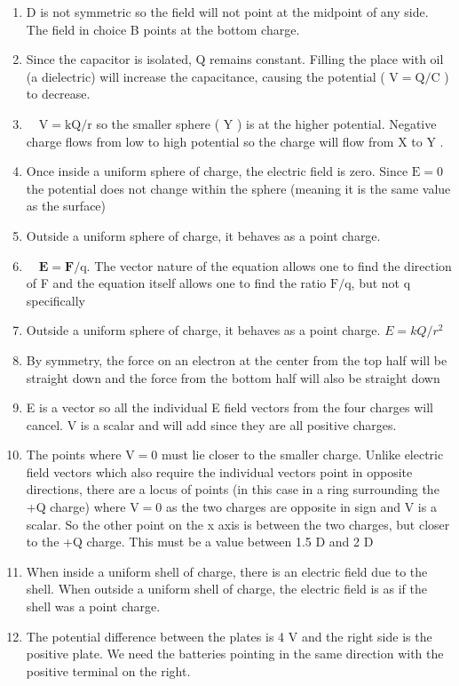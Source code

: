 \begin{enumerate}
\begin{enumerate}
  \item D is not symmetric so the field will not point at the midpoint of any side. The field in choice B points at the bottom charge.
  \item Since the capacitor is isolated, Q remains constant. Filling the place with oil (a dielectric) will increase the capacitance, causing the potential ( $\mathrm{V}=\mathrm{Q} / \mathrm{C}$ ) to decrease.
  \item $\quad \mathrm{V}=\mathrm{kQ} / \mathrm{r}$ so the smaller sphere ( Y ) is at the higher potential. Negative charge flows from low to high potential so the charge will flow from X to Y .
  \item Once inside a uniform sphere of charge, the electric field is zero. Since $\mathrm{E}=0$ the potential does not change within the sphere (meaning it is the same value as the surface)
  \item Outside a uniform sphere of charge, it behaves as a point charge.
  \item $\quad \mathbf{E}=\mathbf{F} / \mathrm{q}$. The vector nature of the equation allows one to find the direction of F and the equation itself allows one to find the ratio $\mathrm{F} / \mathrm{q}$, but not q specifically
  \item Outside a uniform sphere of charge, it behaves as a point charge. $E=k Q / r^{2}$
  \item By symmetry, the force on an electron at the center from the top half will be straight down and the force from the bottom half will also be straight down
  \item E is a vector so all the individual E field vectors from the four charges will cancel. V is a scalar and will add since they are all positive charges.
  \item The points where $\mathrm{V}=0$ must lie closer to the smaller charge. Unlike electric field vectors which also require the individual vectors point in opposite directions, there are a locus of points (in this case in a ring surrounding the +Q charge) where $\mathrm{V}=0$ as the two charges are opposite in sign and V is a scalar. So the other point on the x axis is between the two charges, but closer to the +Q charge. This must be a value between 1.5 D and 2 D
  \item When inside a uniform shell of charge, there is an electric field due to the shell. When outside a uniform shell of charge, the electric field is as if the shell was a point charge.
  \item The potential difference between the plates is 4 V and the right side is the positive plate. We need the batteries pointing in the same direction with the positive terminal on the right.

\end{enumerate}
\end{enumerate}

